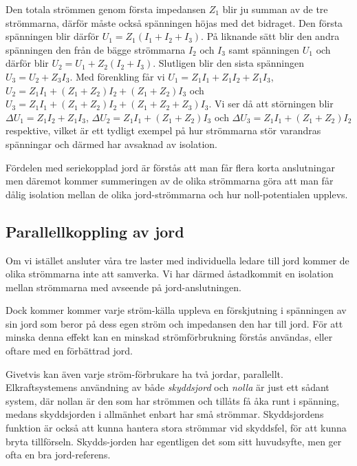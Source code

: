 Den totala strömmen genom första impedansen \(Z_1\) blir ju summan av de tre
strömmarna, därför måste också spänningen höjas med det bidraget. Den första
spänningen blir därför \(U_1=Z_1 (I_1 + I_2 + I_3)\). På liknande sätt blir
den andra spänningen den från de bägge strömmarna \(I_2\) och \(I_3\) samt
spänningen \(U_1\) och därför blir \(U_2 = U_1 + Z_2 (I_2 + I_3)\).
Slutligen blir den sista spänningen \(U_3 = U_2 + Z_3 I_3\). Med förenkling
får vi \(U_1=Z_1 I_1 + Z_1 I_2 + Z_1 I_3\),
\(U_2 = Z_1 I_1 + (Z_1 + Z_2) I_2 + (Z_1 + Z_2) I_3\) och
\(U_3 = Z_1 I_1 + (Z_1 + Z_2) I_2 + (Z_1 + Z_2 + Z_3) I_3\). Vi ser då att
störningen blir \(\Delta U_1 =  Z_1 I_2 + Z_1 I_3\),
\(\Delta U_2 = Z_1 I_1 + (Z_1 + Z_2) I_3\) och
\(\Delta U_3 = Z_1 I_1 + (Z_1 + Z_2) I_2\) respektive, vilket är ett tydligt
exempel på hur strömmarna stör varandras spänningar och därmed har avsaknad
av isolation.

Fördelen med seriekopplad jord är förstås att man får flera korta anslutningar
men däremot kommer summeringen av de olika strömmarna göra att man får dålig
isolation mellan de olika jord-strömmarna och hur noll-potentialen upplevs.

\subsection{Parallellkoppling av jord}

Om vi istället ansluter våra tre laster med individuella ledare till jord
kommer de olika strömmarna inte att samverka. Vi har därmed åstadkommit en
isolation mellan strömmarna med avseende på jord-anslutningen.

Dock kommer kommer varje ström-källa uppleva en förskjutning i spänningen av
sin jord som beror på dess egen ström och impedansen den har till jord. För att
minska denna effekt kan en minskad strömförbrukning förstås användas, eller
oftare med en förbättrad jord.

Givetvis kan även varje ström-förbrukare ha två jordar, parallellt.
Elkraftsystemens användning av både \emph{skyddsjord} och \emph{nolla} är
just ett sådant system, där nollan är den som har strömmen och tillåts få
åka runt i spänning, medans skyddsjorden i allmänhet enbart har små strömmar.
Skyddsjordens funktion är också att kunna hantera stora strömmar vid skyddsfel,
för att kunna bryta tillförseln. Skydds-jorden har egentligen det som
sitt huvudsyfte, men ger ofta en bra jord-referens.

